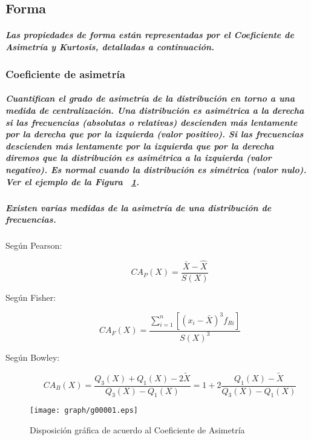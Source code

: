 \subsection{Forma}
\subparagraph{
Las propiedades de forma están representadas por el Coeficiente de Asimetría y Kurtosis, detalladas a continuación.
}	

\subsubsection{Coeficiente de asimetría}
\subparagraph{
Cuantifican el grado de asimetría de la distribución en torno a una medida de centralización. 
Una distribución es asimétrica a la derecha si las frecuencias (absolutas o relativas) descienden más lentamente por la derecha que por la izquierda (valor positivo). Si las frecuencias descienden más lentamente por la izquierda que por la derecha diremos que la distribución es asimétrica a la izquierda (valor negativo). Es normal cuando la distribución es simétrica (valor nulo). Ver el ejemplo de la Figura ~\ref{fig:CoeficienteDeAsimetria}.
}
\subparagraph{
Existen varias medidas de la asimetría de una distribución de frecuencias.
}
\begin{description}
\item[Según Pearson:]
\begin{equation}
CA_{P}(X)=\frac{\bar{X}-\hat{X}}{S(X)}
\end{equation}
\item[Según Fisher:]
\begin{equation}
CA_{F}(X)=\frac{\displaystyle\sum_{i=1}^n[(x_{i}-\bar{X})^{3}f_{Ri}]}{S(X)^{3}}
\end{equation}
\item[Según Bowley:]
\begin{equation}
CA_{B}(X)=\frac{Q_{3}(X)+Q_{1}(X)-2\tilde{X}}{Q_{3}(X)-Q_{1}(X)}=1+2\frac{Q_{1}(X)-\tilde{X}}{Q_{3}(X)-Q_{1}(X)}
\end{equation}
\end{description}
\begin{figure}[ht]
\centering
\texttt{[image: graph/g00001.eps]}
\caption[Coeficiente de Asimetría]{Disposición gráfica de acuerdo al Coeficiente de Asimetría}
\label{fig:CoeficienteDeAsimetria}
\end{figure}


